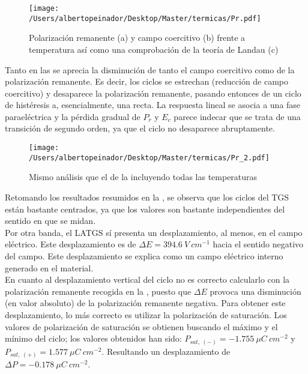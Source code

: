 \documentclass[a4paper, 12pt, spanish]{article}
\begin{document}
\begin{multicols}{2}
\begin{figure}[H]
    \centering
    \texttt{[image: /Users/albertopeinador/Desktop/Master/termicas/Pr.pdf]}
    \caption{Polarización remanente (a) y campo coercitivo (b) frente a temperatura así como una comprobación de la teoría de Landau (c)}\label{fig:param1}
\end{figure}
Tanto en las  se aprecia la disminución de tanto el campo coercitivo como de la polarización remanente. Es decir, los ciclos se estrechan (reducción de campo coercitivo) y desaparece la polarización remanente, pasando entonces de un ciclo de histéresis a, esencialmente, una recta. La respuesta lineal se asocia a una fase paraeléctrica y la pérdida gradual de $P_r$ y $E_c$ parece indecar que se trata de una transición de segundo orden, ya que el ciclo no desaparece abruptamente.
\begin{figure}[H]
    \centering
    \texttt{[image: /Users/albertopeinador/Desktop/Master/termicas/Pr\_2.pdf]}
    \caption{Mismo análisis que el de la  incluyendo todas las temperaturas}\label{fig:Pr2}
\end{figure}

Retomando los resultados resumidos en la , se observa que los ciclos del TGS están bastante centrados, ya que los valores son bastante independientes del sentido en que se midan.\\
Por otra banda, el LATGS sí presenta un desplazamiento, al menos, en el campo eléctrico. Este desplazamiento es de $\Delta E = 394.6\ V\ cm^{-1}$ hacia el sentido negativo del campo. Este desplazamiento se explica como un campo eléctrico interno generado en el material.\\
En cuanto al desplazamiento vertical del ciclo no es correcto calcularlo con la polarización remanente recogida en la , puesto que $\Delta E$ provoca una disminución (en valor absoluto) de la polarización remanente negativa. Para obtener este desplazamiento, lo más correcto es utilizar la polarización de saturación. Los valores de polarización de saturación se obtienen buscando el máximo y el mínimo del ciclo; los valores obtenidos han sido: $P_{sat,\ (-)} = -1.755\ \mu C\ cm^{-2}$ y $P_{sat,\ (+)} = 1.577\ \mu C\ cm^{-2}$. Resultando un desplazamiento de $\Delta P = -0.178\ \mu C\ cm^{-2}$.



\end{multicols}
\end{document}
